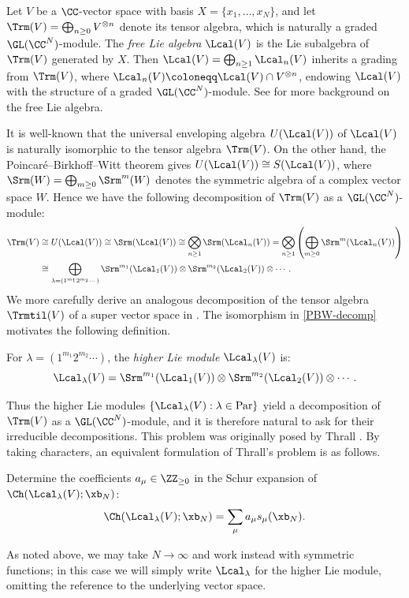 Let $V$ be a $\CC$-vector space with basis $X = \{ x_1,\ldots,x_N \}$, and let $\Trm(V) = \bigoplus_{n \ge 0} V^{\otimes n}$ denote its tensor algebra, which is naturally a graded $\GL(\CC^N)$-module. The \emph{free Lie algebra} $\Lcal(V)$ is the Lie subalgebra of $\Trm(V)$ generated by $X$. Then $\Lcal(V) = \bigoplus_{n \ge 1} \Lcal_n(V)$ inherits a grading from $\Trm(V)$, where $\Lcal_n(V) \coloneqq \Lcal(V) \cap V^{\otimes n}$, endowing $\Lcal(V)$ with the structure of a graded $\GL(\CC^N)$-module. See \cite{Reu} for more background on the free Lie algebra.

It is well-known that the universal enveloping algebra $U(\Lcal(V))$ of $\Lcal(V)$ is naturally isomorphic to the tensor algebra $\Trm(V)$. On the other hand, the Poincar\'e--Birkhoff--Witt theorem gives $U(\Lcal(V)) \cong S(\Lcal(V))$, where $\Srm(W) = \bigoplus_{m \ge 0} \Srm^m(W)$ denotes the symmetric algebra of a complex vector space $W$. Hence we have the following decomposition of $\Trm(V)$ as a $\GL(\CC^N)$-module:
\begin{align}
\Trm(V) &\cong U(\Lcal(V)) \cong \Srm(\Lcal(V)) \cong \bigotimes_{n \ge 1} \Srm(\Lcal_n(V)) = \bigotimes_{n \ge 1} \left( \bigoplus_{m \ge 0} \Srm^m(\Lcal_n(V)) \right) \nonumber \\
&\cong \bigoplus_{\lambda = (1^{m_1}2^{m_2} \cdots)} \Srm^{m_1}(\Lcal_1(V)) \otimes \Srm^{m_2}(\Lcal_2(V)) \otimes \cdots. \label{PBW-decomp}
\end{align}
We more carefully derive an analogous decomposition of the tensor algebra $\Trmtil(V)$ of a super vector space in . The isomorphism in \eqref{PBW-decomp} motivates the following definition.
\begin{defi}\label{def:lie-mod}
For $\lambda = (1^{m_1}2^{m_2} \cdots)$, the \emph{higher Lie module} $\Lcal_\lambda(V)$ is:
\[
\Lcal_\lambda(V) = \Srm^{m_1}(\Lcal_1(V)) \otimes \Srm^{m_2}(\Lcal_2(V)) \otimes \cdots.
\]
\end{defi}
Thus the higher Lie modules $\{ \Lcal_\lambda(V) : \lambda \in \mathrm{Par} \}$ yield a decomposition of $\Trm(V)$ as a $\GL(\CC^N)$-module, and it is therefore natural to ask for their irreducible decompositions. This problem was originally posed by Thrall \cite{Thrall}. By taking characters, an equivalent formulation of Thrall's problem is as follows.
\begin{prob}
  Determine the coefficients $a_\mu \in \ZZ_{\ge 0}$ in the Schur expansion of $\Ch(\Lcal_\lambda(V);\xb_N)$:
  \[
  \Ch(\Lcal_\lambda(V);\xb_N) = \sum_\mu a_\mu s_\mu(\xb_N).
  \]
\end{prob}
As noted above, we may take $N \to \infty$ and work instead with symmetric functions; in this case we will simply write $\Lcal_\lambda$ for the higher Lie module, omitting the reference to the underlying vector space.

